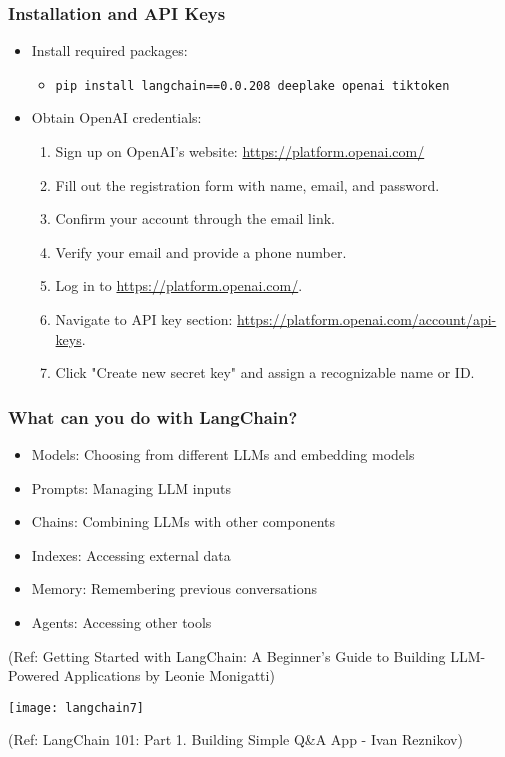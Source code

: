 \begin{frame}
\frametitle{Installation and API Keys}

\begin{itemize}
    \item Install required packages:
    \begin{itemize}
        \item \texttt{pip install langchain==0.0.208 deeplake openai tiktoken}
    \end{itemize}
    \item Obtain OpenAI credentials:
    \begin{enumerate}
        \item Sign up on OpenAI's website: \url{https://platform.openai.com/}
        \item Fill out the registration form with name, email, and password.
        \item Confirm your account through the email link.
        \item Verify your email and provide a phone number.
        \item Log in to \url{https://platform.openai.com/}.
        \item Navigate to API key section: \url{https://platform.openai.com/account/api-keys}.
        \item Click "Create new secret key" and assign a recognizable name or ID.
    \end{enumerate}
\end{itemize}

\end{frame}


\begin{frame}[fragile]\frametitle{What can you do with LangChain?}

\begin{itemize}
\item Models: Choosing from different LLMs and embedding models
\item Prompts: Managing LLM inputs
\item Chains: Combining LLMs with other components
\item Indexes: Accessing external data
\item Memory: Remembering previous conversations
\item Agents: Accessing other tools
\end{itemize}

{\tiny (Ref: Getting Started with LangChain: A Beginner’s Guide to Building LLM-Powered Applications by Leonie Monigatti)}

\begin{center}
\texttt{[image: langchain7]}
\end{center}	  


{\tiny (Ref: LangChain 101: Part 1. Building Simple Q\&A App - Ivan Reznikov)}
\end{frame}


